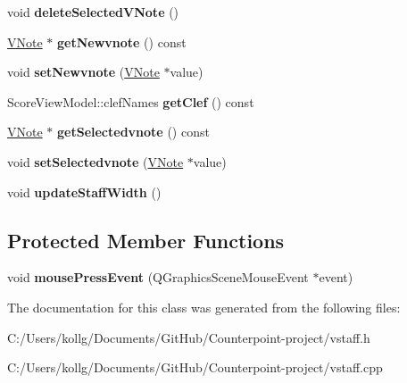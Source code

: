 \begin{DoxyCompactItemize}
\item 
\hypertarget{class_v_staff_ac7e53a5a6092b7b57ab0a1f36d2357d9}{}void {\bfseries delete\+Selected\+V\+Note} ()\label{class_v_staff_ac7e53a5a6092b7b57ab0a1f36d2357d9}

\item 
\hypertarget{class_v_staff_ad42533b9604fd8abec281dcf6d1be8ee}{}\hyperlink{class_v_note}{V\+Note} $\ast$ {\bfseries get\+Newvnote} () const \label{class_v_staff_ad42533b9604fd8abec281dcf6d1be8ee}

\item 
\hypertarget{class_v_staff_a2b8d021fd00eaf7e4fda38a2c58b8d9e}{}void {\bfseries set\+Newvnote} (\hyperlink{class_v_note}{V\+Note} $\ast$value)\label{class_v_staff_a2b8d021fd00eaf7e4fda38a2c58b8d9e}

\item 
\hypertarget{class_v_staff_aaf1790a96768e184d2b6c1299d4eb230}{}Score\+View\+Model\+::clef\+Names {\bfseries get\+Clef} () const \label{class_v_staff_aaf1790a96768e184d2b6c1299d4eb230}

\item 
\hypertarget{class_v_staff_ae38cc7590d13e6992e996c91dd209cb4}{}\hyperlink{class_v_note}{V\+Note} $\ast$ {\bfseries get\+Selectedvnote} () const \label{class_v_staff_ae38cc7590d13e6992e996c91dd209cb4}

\item 
\hypertarget{class_v_staff_a2c1531ee4734bccf5ffe7bd66f988583}{}void {\bfseries set\+Selectedvnote} (\hyperlink{class_v_note}{V\+Note} $\ast$value)\label{class_v_staff_a2c1531ee4734bccf5ffe7bd66f988583}

\item 
\hypertarget{class_v_staff_ac96715515c3f55229ba114293ece82fd}{}void {\bfseries update\+Staff\+Width} ()\label{class_v_staff_ac96715515c3f55229ba114293ece82fd}

\end{DoxyCompactItemize}
\subsection*{Protected Member Functions}
\begin{DoxyCompactItemize}
\item 
\hypertarget{class_v_staff_a570bacf43a4ba401525bda3b037d3c0d}{}void {\bfseries mouse\+Press\+Event} (Q\+Graphics\+Scene\+Mouse\+Event $\ast$event)\label{class_v_staff_a570bacf43a4ba401525bda3b037d3c0d}

\end{DoxyCompactItemize}


The documentation for this class was generated from the following files\+:\begin{DoxyCompactItemize}
\item 
C\+:/\+Users/kollg/\+Documents/\+Git\+Hub/\+Counterpoint-\/project/vstaff.\+h\item 
C\+:/\+Users/kollg/\+Documents/\+Git\+Hub/\+Counterpoint-\/project/vstaff.\+cpp\end{DoxyCompactItemize}
